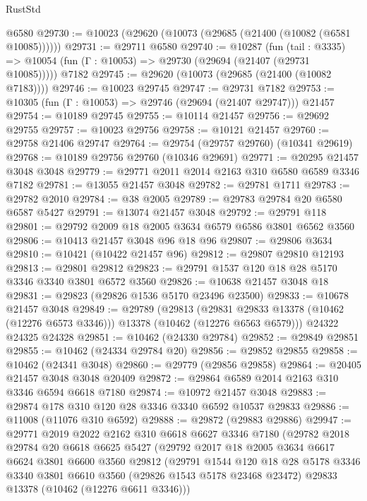 \begin{lexlean}{RustStd}
\begin{coremodule}
    @6580
@29730 := @10023 (@29620 (@10073 (@29685 (@21400 (@10082 (@6581 @10085))))))
@29731 := @29711 @6580
@29740 := @10287
    (fun (tail : @3335) => @10054 (fun (Γ : @10053) => @29730 (@29694 (@21407 (@29731 @10085)))))
    @7182
@29745 := @29620 (@10073 (@29685 (@21400 (@10082 @7183))))
@29746 := @10023 @29745
@29747 := @29731 @7182
@29753 := @10305 (fun (Γ : @10053) => @29746 (@29694 (@21407 @29747))) @21457
@29754 := @10189 @29745
@29755 := @10114 @21457
@29756 := @29692 @29755
@29757 := @10023 @29756
@29758 := @10121 @21457
@29760 := @29758 @21406 @29747
@29764 := @29754 (@29757 @29760) (@10341 @29619)
@29768 := @10189 @29756 @29760 (@10346 @29691)
@29771 := @20295 @21457 @3048 @3048
@29779 := @29771 @2011 @2014 @2163 @310 @6580 @6589 @3346 @7182
@29781 := @13055 @21457 @3048
@29782 := @29781 @1711
@29783 := @29782 @2010
@29784 := @38 @2005
@29789 := @29783 @29784 @20 @6580 @6587 @5427
@29791 := @13074 @21457 @3048
@29792 := @29791 @118
@29801 := @29792 @2009 @18 @2005 @3634 @6579 @6586 @3801 @6562 @3560
@29806 := @10413 @21457 @3048 @96 @18 @96
@29807 := @29806 @3634
@29810 := @10421 (@10422 @21457 @96)
@29812 := @29807 @29810 @12193
@29813 := @29801 @29812
@29823 := @29791 @1537 @120 @18 @28 @5170 @3346 @3340 @3801 @6572 @3560
@29826 := @10638 @21457 @3048 @18
@29831 := @29823 (@29826 @1536 @5170 @23496 @23500)
@29833 := @10678 @21457 @3048
@29849 := @29789
    (@29813
      (@29831 @29833 @13378 (@10462 (@12276 @6573 @3346)))
      @13378
      (@10462 (@12276 @6563 @6579)))
    @24322
    @24325
    @24328
@29851 := @10462 (@24330 @29784)
@29852 := @29849 @29851
@29855 := @10462 (@24334 @29784 @20)
@29856 := @29852 @29855
@29858 := @10462 (@24341 @3048)
@29860 := @29779 (@29856 @29858)
@29864 := @20405 @21457 @3048 @3048 @20409
@29872 := @29864 @6589 @2014 @2163 @310 @3346 @6594 @6618 @7180
@29874 := @10972 @21457 @3048
@29883 := @29874 @178 @310 @120 @28 @3346 @3340 @6592 @10537 @29833
@29886 := @11008 (@11076 @310 @6592)
@29888 := @29872 (@29883 @29886)
@29947 := @29771
    @2019
    @2022
    @2162
    @310
    @6618
    @6627
    @3346
    @7180
    (@29782
      @2018
      @29784
      @20
      @6618
      @6625
      @5427
      (@29792
        @2017
        @18
        @2005
        @3634
        @6617
        @6624
        @3801
        @6600
        @3560
        @29812
        (@29791
          @1544
          @120
          @18
          @28
          @5178
          @3346
          @3340
          @3801
          @6610
          @3560
          (@29826 @1543 @5178 @23468 @23472)
          @29833
          @13378
          (@10462 (@12276 @6611 @3346)))

\end{coremodule}
\end{lexlean}
